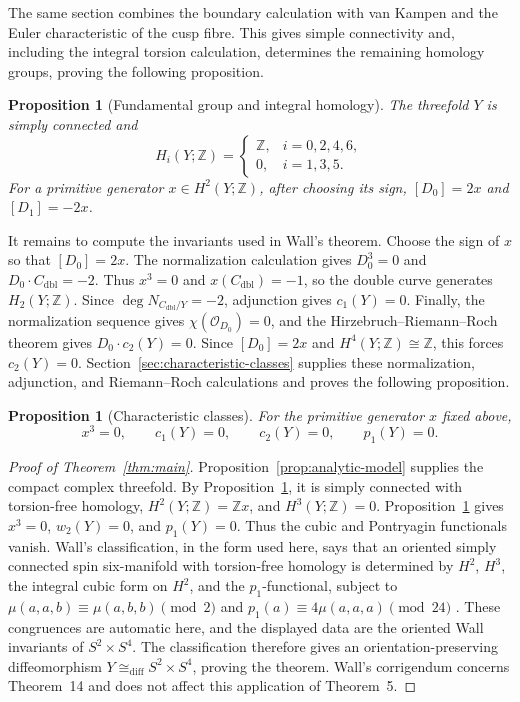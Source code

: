 \documentclass[11pt]{article}
\newtheorem{proposition}[theorem]{Proposition}
\theoremstyle{definition}
\theoremstyle{remark}
\numberwithin{equation}{section}
\newcommand{\ZZ}{\mathbb Z}
\begin{document}
The same section combines the boundary calculation with van Kampen and the
Euler characteristic of the cusp fibre.  This gives simple connectivity and,
including the integral torsion calculation, determines the remaining
homology groups, proving the following proposition.

\begin{proposition}[Fundamental group and integral homology]\label{prop:integral-topology}
The threefold $Y$ is simply connected and
\[
 H_i(Y;\ZZ)=
 \begin{cases}
  \ZZ,&i=0,2,4,6,\\
  0,&i=1,3,5.
 \end{cases}
\]
For a primitive generator $x\in H^2(Y;\ZZ)$, after choosing its sign,
$[D_0]=2x$ and $[D_1]=-2x$.
\end{proposition}

It remains to compute the invariants used in Wall's theorem.  Choose the sign
of $x$ so that $[D_0]=2x$.  The normalization calculation gives
$D_0^3=0$ and $D_0\cdot C_{\mathrm{dbl}}=-2$.  Thus $x^3=0$ and
$x(C_{\mathrm{dbl}})=-1$, so the double curve generates
$H_2(Y;\mathbb Z)$.  Since
$\deg N_{C_{\mathrm{dbl}}/Y}=-2$, adjunction gives $c_1(Y)=0$.
Finally, the normalization sequence gives $\chi(\mathcal O_{D_0})=0$, and
the Hirzebruch--Riemann--Roch theorem gives $D_0\cdot c_2(Y)=0$.  Since
$[D_0]=2x$ and $H^4(Y;\mathbb Z)\cong\mathbb Z$, this forces
$c_2(Y)=0$.  Section~\ref{sec:characteristic-classes} supplies these
normalization, adjunction, and Riemann--Roch calculations and proves the
following proposition.

\begin{proposition}[Characteristic classes]
\label{prop:characteristic-classes}
For the primitive generator $x$ fixed above,
\[
 x^3=0,\qquad c_1(Y)=0,\qquad c_2(Y)=0,
 \qquad p_1(Y)=0.
\]
\end{proposition}

\begin{proof}[Proof of Theorem~\ref{thm:main}]
Proposition~\ref{prop:analytic-model} supplies the compact complex
threefold.  By Proposition~\ref{prop:integral-topology}, it is simply
connected with torsion-free homology, $H^2(Y;\ZZ)=\ZZ x$, and
$H^3(Y;\ZZ)=0$.  Proposition~\ref{prop:characteristic-classes} gives
$x^3=0$, $w_2(Y)=0$, and $p_1(Y)=0$.  Thus the cubic and Pontryagin
functionals vanish.  Wall's classification, in the form used here, says that
an oriented simply connected spin six-manifold with torsion-free homology is
determined by $H^2$, $H^3$, the integral cubic form on $H^2$, and the
$p_1$-functional, subject to
$\mu(a,a,b)\equiv\mu(a,b,b)\pmod2$ and
$p_1(a)\equiv4\mu(a,a,a)\pmod{24}$
\citep[Theorem~5]{Wall1966}.  These congruences are automatic here, and the
displayed data are the oriented Wall invariants of $S^2\times S^4$.
The classification therefore gives an
orientation-preserving diffeomorphism
$Y\cong_{\mathrm{diff}}S^2\times S^4$, proving the theorem.
Wall's corrigendum \citep{Wall1967} concerns Theorem~14 and does not affect
this application of Theorem~5.\qedhere
\end{proof}




\appendix




\end{document}
